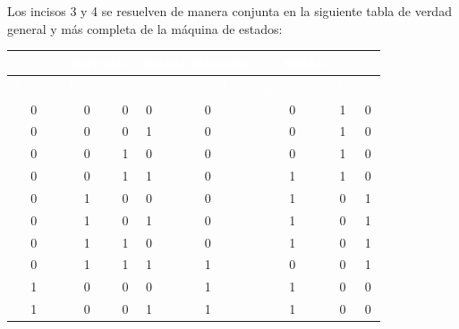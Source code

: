 \documentclass[12pt, letterpaper]{article}
\begin{document}
\begin{tcolorbox}[colback=gray!20,colframe=LimeGreen!75!black]
    Los incisos 3 y 4 se resuelven de manera conjunta en la siguiente tabla de verdad general y más completa de la máquina de estados:

    \begin{table}[H]
    \renewcommand{\arraystretch}{1.2}
    \begin{center}
        \begin{tabular}{|cc|cc|cc|cc|}
        \hline
        \rowcolor{black!80}
        \multicolumn{2}{|c|}{\textcolor{white}{\textbf{Estado Actual}}} & \multicolumn{2}{c|}{\textcolor{white}{\textbf{Entradas}}} & \multicolumn{2}{c|}{\textcolor{white}{\textbf{Estado Siguiente}}} & \multicolumn{2}{c|}{\textcolor{white}{\textbf{Salidas}}} \\
        \hline
        \rowcolor{black!80}
        \textcolor{white}{\textbf{$E_1(t)$}} & \textcolor{white}{\textbf{$E_0(t)$}} & \textcolor{white}{\textbf{$X$}} & \textcolor{white}{\textbf{$Y$}} & \textcolor{white}{\textbf{$Q_1(t+1)$}} & \textcolor{white}{\textbf{$Q_0(t+1)$}} & \textcolor{white}{\textbf{$S_1$}} & \textcolor{white}{\textbf{$S_0$}} \\
        \hline
        0 & 0 & 0 & 0 & 0 & 0 & \cellcolor{ForestGreen!90}1 & \cellcolor{ForestGreen!90}0 \\
        0 & 0 & 0 & 1 & 0 & 0 & \cellcolor{ForestGreen!90}1 & \cellcolor{ForestGreen!90}0 \\
        0 & 0 & 1 & 0 & 0 & 0 & \cellcolor{ForestGreen!90}1 & \cellcolor{ForestGreen!90}0 \\
        0 & 0 & 1 & 1 & 0 & 1 & \cellcolor{ForestGreen!90}1 & \cellcolor{ForestGreen!90}0 \\
        \hline
        0 & 1 & 0 & 0 & 0 & 1 & \cellcolor{ForestGreen!90}0 & \cellcolor{ForestGreen!90}1 \\
        0 & 1 & 0 & 1 & 0 & 1 & \cellcolor{ForestGreen!90}0 & \cellcolor{ForestGreen!90}1 \\
        0 & 1 & 1 & 0 & 0 & 1 & \cellcolor{ForestGreen!90}0 & \cellcolor{ForestGreen!90}1 \\
        0 & 1 & 1 & 1 & 1 & 0 & \cellcolor{ForestGreen!90}0 & \cellcolor{ForestGreen!90}1 \\
        \hline
        1 & 0 & 0 & 0 & 1 & 1 & \cellcolor{ForestGreen!90}0 & \cellcolor{ForestGreen!90}0 \\
        1 & 0 & 0 & 1 & 1 & 1 & \cellcolor{ForestGreen!90}0 & \cellcolor{ForestGreen!90}0 \\

\end{tabular}
\end{center}
\end{table}
\end{tcolorbox}
\end{document}

